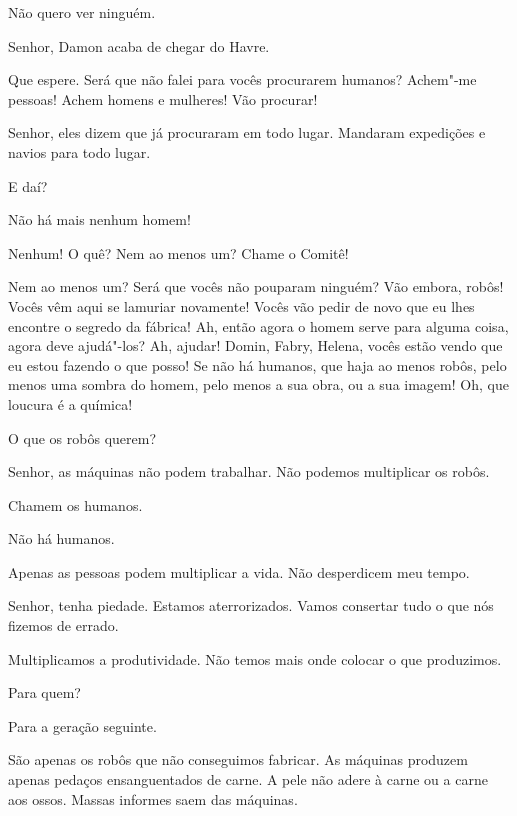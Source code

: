  Não quero ver ninguém.

 Senhor, Damon acaba de chegar do Havre.

 Que espere.  Será que não falei para vocês
procurarem humanos? Achem"-me pessoas! Achem homens e mulheres! Vão procurar!

 Senhor, eles dizem que já procuraram em todo lugar. Mandaram expedições
e navios para todo lugar.

 E daí?

 Não há mais nenhum homem!

  Nenhum! O quê? Nem ao menos um? Chame o Comitê!

  Nem ao menos um? Será que vocês não pouparam ninguém?
 Vão embora, robôs! Vocês vêm aqui se lamuriar novamente! Vocês vão
pedir de novo que eu lhes encontre o segredo da fábrica! Ah, então agora o homem
serve para alguma coisa, agora deve ajudá"-los? Ah, ajudar! Domin, Fabry,
Helena, vocês estão vendo que eu estou fazendo o que posso! Se não há humanos,
que haja ao menos robôs, pelo menos uma sombra do homem, pelo menos a sua obra, ou
a sua imagem! Oh, que loucura é a química!


  O que os robôs querem?

 Senhor, as máquinas não podem trabalhar. Não podemos
multiplicar os robôs.

 Chamem os humanos.

 Não há humanos.

 Apenas as pessoas podem multiplicar a vida. Não desperdicem  meu tempo.

 Senhor, tenha piedade. Estamos aterrorizados. Vamos consertar tudo o
que nós fizemos de errado.

 Multiplicamos a produtividade. Não temos mais onde colocar o que
produzimos.

 Para quem?

 Para a geração seguinte.

 São apenas os robôs que não conseguimos fabricar. As máquinas
produzem apenas pedaços ensanguentados de carne. A pele não adere à carne ou a
carne aos ossos. Massas informes saem das máquinas.

